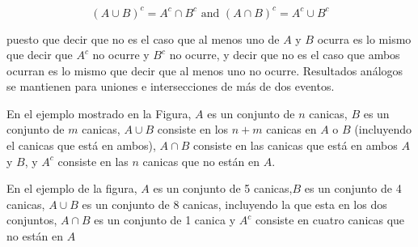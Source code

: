 \documentclass[
]{book}
\theoremstyle{definition}
\theoremstyle{definition}
\theoremstyle{definition}
\theoremstyle{definition}
\theoremstyle{remark}
\begin{document}
\[(A \cup B)^c = A^c \cap B^c \textrm{ and } (A \cap B)^c = A^c \cup B^c\]

puesto que decir que no es el caso que al menos uno de \(A\) y \(B\) ocurra es lo mismo que decir que \(A^c\) no ocurre y \(B^c\) no ocurre, y decir que no es el caso que ambos ocurran es lo mismo que decir que al menos uno no ocurre. Resultados análogos se mantienen para uniones e intersecciones de más de dos eventos.

En el ejemplo mostrado en la Figura, \(A\) es un conjunto de \(n\) canicas, \(B\) es un conjunto de \(m\) canicas, \(A \cup B\) consiste en los \(n + m\) canicas en \(A\) o \(B\) (incluyendo el canicas que está en ambos), \(A \cap B\) consiste en las canicas que está en ambos \(A\) y \(B\), y \(A^c\) consiste en las \(n\) canicas que no están en \(A\).

En el ejemplo de la figura, \(A\) es un conjunto de 5 canicas,\(B\) es un conjunto de 4 canicas, \(A \cup B\) es un conjunto de 8 canicas, incluyendo la que esta en los dos conjuntos, \(A \cap B\) es un conjunto de 1 canica y \(A^c\) consiste en cuatro canicas que no están en \(A\)
\end{document}
